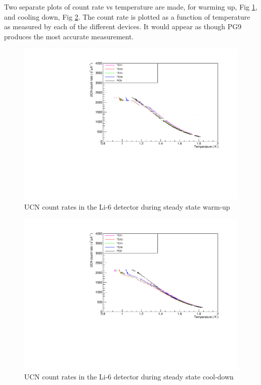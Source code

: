 \documentclass[10pt,letterpaper]{article}
\begin{document}
Two separate plots of count rate vs temperature are made, for warming up, Fig \ref{fig:steadyWarm}, and cooling down, Fig \ref{fig:steadyCool}. The count rate is plotted as a function of temperature as measured by each of the different devices. It would appear as though PG9 produces the most accurate measurement.

\begin{figure}
\centering
\includegraphics[width=\textwidth,page=1]{../steady_state/li6RateVsTempRun1162.pdf}
\caption{UCN count rates in the Li-6 detector during steady state warm-up}
\label{fig:steadyWarm}
\end{figure}

\begin{figure}
\centering
\includegraphics[width=\textwidth,page=1]{../steady_state/li6RateVsTempRun1163.pdf}
\caption{UCN count rates in the Li-6 detector during steady state cool-down}
\label{fig:steadyCool}
\end{figure}
\end{document}
